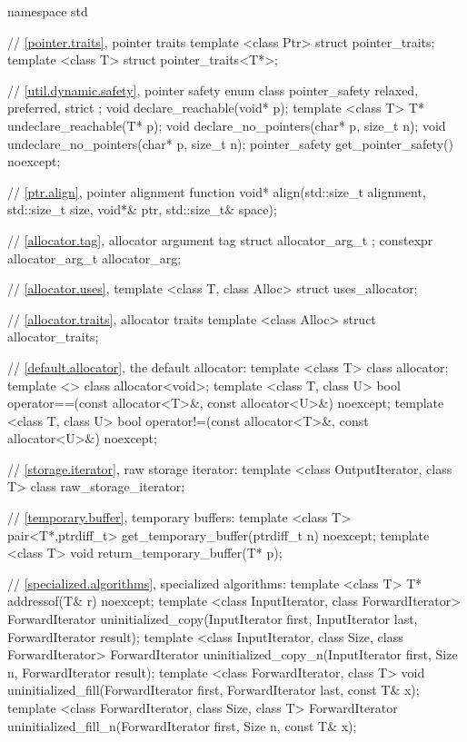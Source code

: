 %
\begin{codeblock}
namespace std {
  // \ref{pointer.traits}, pointer traits
  template <class Ptr> struct pointer_traits;
  template <class T> struct pointer_traits<T*>;

  // \ref{util.dynamic.safety}, pointer safety
  enum class pointer_safety { relaxed, preferred, strict };
  void declare_reachable(void* p);
  template <class T> T* undeclare_reachable(T* p);
  void declare_no_pointers(char* p, size_t n);
  void undeclare_no_pointers(char* p, size_t n);
  pointer_safety get_pointer_safety() noexcept;

  // \ref{ptr.align}, pointer alignment function
  void* align(std::size_t alignment, std::size_t size,
    void*& ptr, std::size_t& space);

  // \ref{allocator.tag}, allocator argument tag
  struct allocator_arg_t { };
  constexpr allocator_arg_t allocator_arg{};

  // \ref{allocator.uses}, 
  template <class T, class Alloc> struct uses_allocator;

  // \ref{allocator.traits}, allocator traits
  template <class Alloc> struct allocator_traits;

  // \ref{default.allocator}, the default allocator:
  template <class T> class allocator;
  template <> class allocator<void>;
  template <class T, class U>
    bool operator==(const allocator<T>&, const allocator<U>&) noexcept;
  template <class T, class U>
    bool operator!=(const allocator<T>&, const allocator<U>&) noexcept;

  // \ref{storage.iterator}, raw storage iterator:
  template <class OutputIterator, class T> class raw_storage_iterator;

  // \ref{temporary.buffer}, temporary buffers:
  template <class T>
    pair<T*,ptrdiff_t> get_temporary_buffer(ptrdiff_t n) noexcept;
  template <class T>
    void return_temporary_buffer(T* p);

  // \ref{specialized.algorithms}, specialized algorithms:
  template <class T> T* addressof(T& r) noexcept;
  template <class InputIterator, class ForwardIterator>
    ForwardIterator uninitialized_copy(InputIterator first, InputIterator last,
                                       ForwardIterator result);
  template <class InputIterator, class Size, class ForwardIterator>
    ForwardIterator uninitialized_copy_n(InputIterator first, Size n,
                                         ForwardIterator result);
  template <class ForwardIterator, class T>
    void uninitialized_fill(ForwardIterator first, ForwardIterator last,
                            const T& x);
  template <class ForwardIterator, class Size, class T>
    ForwardIterator uninitialized_fill_n(ForwardIterator first, Size n, const T& x);

}
\end{codeblock}
